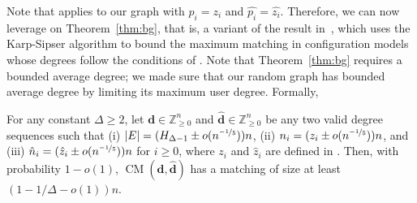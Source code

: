 \documentclass[11pt]{article}
\DeclareMathOperator*{\CM}{CM}
\begin{document}
Note that  applies to our graph with $p_i=z_i$ and $\hat{p_i}=\hat{z_i}$. Therefore, we can now leverage on Theorem~\ref{thm:bg}, that is, a variant of the result in~\cite{bg15}, which uses the Karp-Sipser algorithm to bound the maximum matching in  configuration models whose degrees follow the conditions of . Note that Theorem~\ref{thm:bg} requires a bounded average degree; we made sure that our random graph has bounded average degree by limiting its maximum user degree. Formally, 
\begin{lemma}\label{lem:karp-sipser-conf-model}
For any constant $\Delta\geq 2$, let $\mathbf{d}\in\mathbb{Z}_{\geq0}^n$ and $\mathbf{\hat{d}}\in\mathbb{Z}_{\geq0}^n$ be any two valid degree sequences such that (i) $|E|=(H_{\Delta-1}\pm o(n^{\nicefrac{-1}5}))n$, (ii) $n_i=(z_i \pm o(n^{\nicefrac{-1}5}))n$, and (iii) $\hat{n}_i = (\hat{z}_i \pm o(n^{\nicefrac{-1}5}))n$ for $i\geq 0$, where $z_i$ and $\hat{z}_i$ are defined in . Then, with probability $1-o(1)$, $\CM(\mathbf{d}, \mathbf{\hat{d}})$ has a matching of size at least $(1-1/\Delta -o(1))n$.
\end{lemma}
\end{document}
